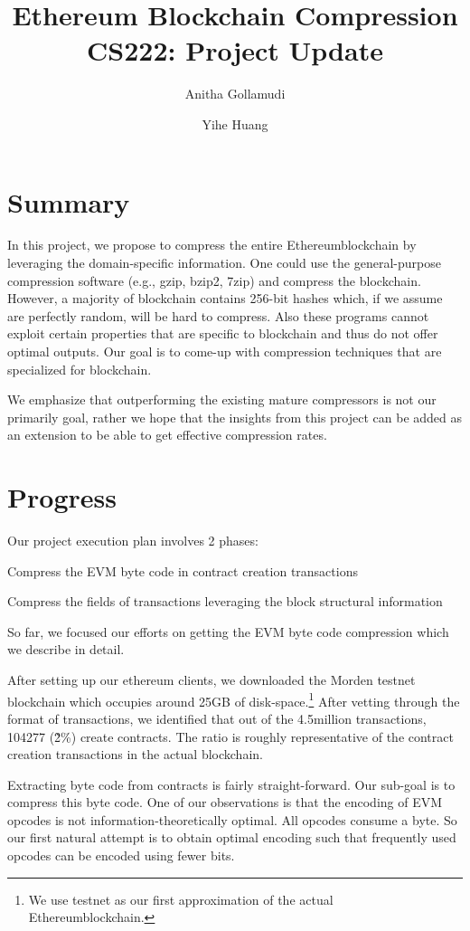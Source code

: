 \documentclass[12pt]{article}
\title{Ethereum Blockchain Compression\\
	\large CS222: Project Update
	}
\author{Anitha Gollamudi 
	\and
	Yihe Huang}
\newcommand\peth{Ethereum}
\begin{document}
%

\maketitle

\section{Summary}
In this project, we propose to compress the entire \peth blockchain by leveraging the domain-specific information.
One could use the general-purpose compression software (e.g., gzip, bzip2, 7zip) and compress the blockchain.
However, a majority of blockchain contains 256-bit hashes which, if we assume are perfectly random, will be hard to compress.
Also these programs cannot exploit certain properties that are specific to blockchain and thus do not offer optimal outputs.
Our goal is to come-up with compression techniques that  are specialized for blockchain.

We emphasize that outperforming the existing mature compressors is not our primarily goal, rather
we hope that the insights from this project can be added as an extension to be able to get effective compression rates.   

\section{Progress}
Our project execution plan involves 2 phases: 
\begin{enumerate*}
	\item Compress the EVM byte code in contract creation transactions 
	\item Compress the fields of transactions leveraging the block structural information
\end{enumerate*}
So far, we focused our efforts on getting the EVM byte code compression which we describe in detail.

After setting up our ethereum clients, we downloaded the Morden testnet blockchain which occupies around 25GB of disk-space.\footnote{We use testnet as our first approximation of the actual \peth blockchain.} 
After vetting through the format of transactions, we identified that out of the 4.5million transactions,  104277 (\~2\%) create contracts.
The ratio is roughly representative of the contract creation transactions in the actual blockchain.

Extracting byte code from contracts is fairly straight-forward. Our sub-goal is to compress this byte code.
One of our observations is that the encoding of EVM opcodes is not information-theoretically optimal. All opcodes consume a byte.
So our first natural attempt is to obtain optimal encoding such that frequently used opcodes can be encoded using fewer bits.
\end{document}
